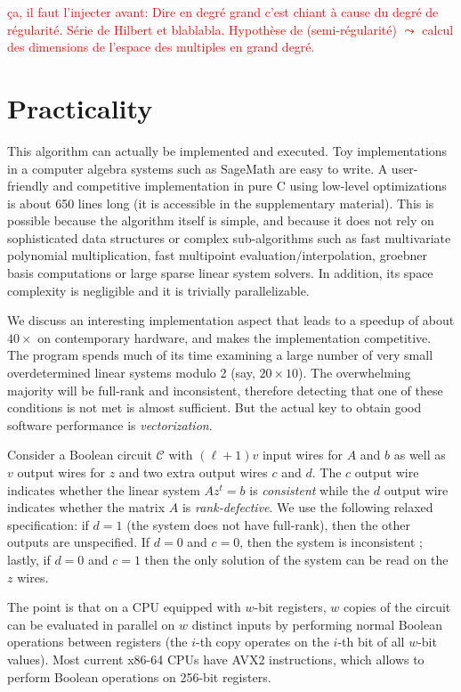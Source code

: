 \documentclass[a4paper,UKenglish,cleveref, autoref]{lipics-v2019}
\begin{document}
\textcolor{red}{ça, il faut l'injecter avant:
	Dire en degré grand c'est chiant à cause du degré de régularité. Série de Hilbert et blablabla. Hypothèse de (semi-régularité) $\leadsto$ calcul des dimensions de l'espace des multiples en grand degré.}



\section{Practicality}

This algorithm can actually be implemented and executed. Toy implementations in
a computer algebra systems such as \textsf{SageMath} are easy to write. A
user-friendly and competitive implementation in pure C using low-level
optimizations is about 650 lines long (it is accessible in the supplementary
material). This is possible because the algorithm itself is simple, and because
it does not rely on sophisticated data structures or complex sub-algorithms such
as fast multivariate polynomial multiplication, fast multipoint
evaluation/interpolation, groebner basis computations or large sparse linear
system solvers. In addition, its space complexity is negligible and it is
trivially parallelizable.

We discuss an interesting implementation aspect that leads to a speedup of about
$40 \times$ on contemporary hardware, and makes the implementation
competitive. The program spends much of its time examining a large number of
very small overdetermined linear systems modulo 2 (say, $20 \times 10$). The
overwhelming majority will be full-rank and inconsistent, therefore detecting
that one of these conditions is not met is almost sufficient. But the actual key
to obtain good software performance is \emph{vectorization}.

Consider a Boolean circuit $\mathcal{C}$ with $(\ell+1)v$ input wires for $A$
and $b$ as well as $v$ output wires for $z$ and two extra output wires $c$ and
$d$. The $c$ output wire indicates whether the linear system $A z^t = b$ is
\emph{consistent} while the $d$ output wire indicates whether the matrix $A$ is
\emph{rank-defective}. We use the following relaxed specification: if $d=1$ (the
system does not have full-rank), then the other outputs are unspecified. If
$d=0$ and $c=0$, then the system is inconsistent ; lastly, if $d=0$ and $c=1$
then the only solution of the system can be read on the $z$ wires.

The point is that on a CPU equipped with $w$-bit registers, $w$ copies of the
circuit can be evaluated in parallel on $w$ distinct inputs by performing normal
Boolean operations between registers (the $i$-th copy operates on the $i$-th bit
of all $w$-bit values). Most current \textsf{x86-64} CPUs have \textsf{AVX2}
instructions, which allows to perform Boolean operations on 256-bit registers.
\end{document}
